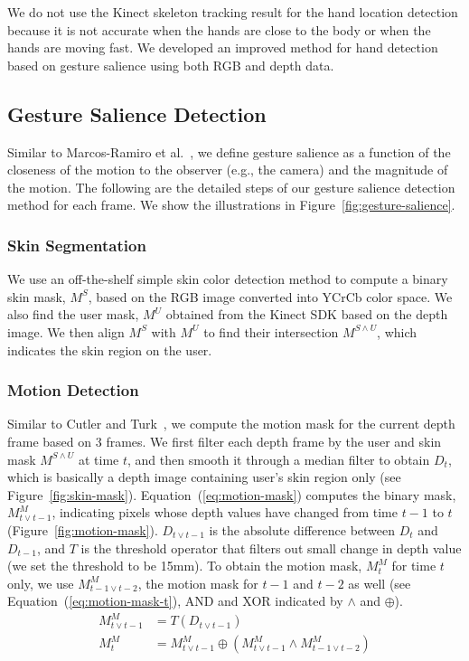 \documentclass{acm_proc_article-sp}
\begin{document}
We do not use the Kinect skeleton tracking result for the hand location detection because
it is not accurate when the hands are close to the body or when the hands are moving fast.
We developed an improved method for hand detection based on gesture salience using both
RGB and depth data.

\subsection{Gesture Salience Detection}
Similar to Marcos-Ramiro et al.~\cite{marcos2013}, we define gesture salience as a function of 
the closeness of the motion to the observer (e.g., the camera) and the magnitude of the motion.
The following are the detailed steps of our gesture salience detection method for each frame. 
We show the illustrations in Figure~\ref{fig:gesture-salience}. 

\subsubsection{Skin Segmentation}
We use an off-the-shelf simple skin color detection method to compute a binary skin mask, $M^S$, based on the RGB image converted into YCrCb
color space.  We also find the user mask, $M^U$ obtained from the Kinect SDK based on the depth image. 
We then align $M^S$ with $M^U$ to find their intersection $M^{S\wedge U}$, which indicates the skin region on the user.

\subsubsection{Motion Detection}
Similar to Cutler and Turk~\cite{cutler1998}, we compute the motion mask for the current depth frame based on 3 frames. We first filter each 
depth frame by the user and skin mask $M^{S\wedge U}$ at time $t$, and then
smooth it through a median filter to obtain $D_t$, which is basically a depth image containing user's skin region only (see Figure~\ref{fig:skin-mask}).
Equation~(\ref{eq:motion-mask}) computes the binary mask, $M_{t\vee t-1}^M$, indicating pixels whose depth values have changed from time $t-1$ to $t$ (Figure~\ref{fig:motion-mask}).
$D_{t\vee t-1}$ is the absolute difference between $D_t$ and $D_{t-1}$, and $T$ is the threshold operator that filters out small change in depth value 
(we set the threshold to be 15mm). 
To obtain the motion mask, $M_{t}^M$ for time $t$ only, we use $M_{t-1\vee t-2}^M$, the motion mask for $t-1$ and $t-2$ as well (see Equation~(\ref{eq:motion-mask-t}),
 AND and XOR indicated by $\wedge$ and $\oplus$).
\begin{align}
M_{t\vee t-1}^M &= T(D_{t\vee t-1}) \label{eq:motion-mask} \\
M_{t}^M &= M_{t\vee t-1}^M \oplus (M_{t\vee t-1}^M \wedge M_{t-1\vee t-2}^M) \label{eq:motion-mask-t}
\end{align}
\end{document}
